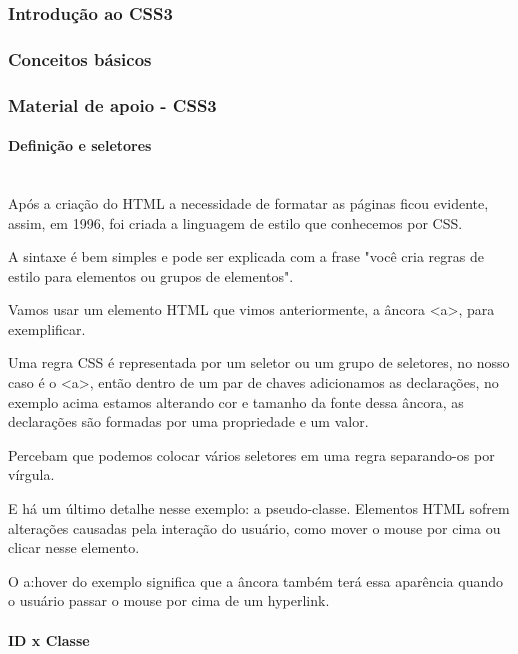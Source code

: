 \documentclass[12pt,a4paper]{article}
\begin{document}
	\subsubsection{Introdução ao CSS3}
	
	\subsubsection{Conceitos básicos}
	
	\subsubsection{Material de apoio - CSS3}
	
	\paragraph{Definição e seletores} \mbox{} \\
	
	Após a criação do HTML a necessidade de formatar as páginas ficou evidente, assim, em 1996, foi criada a linguagem de estilo que conhecemos por CSS.
	
	A sintaxe é bem simples e pode ser explicada com a frase "você cria regras de estilo para elementos ou grupos de elementos".
	
	Vamos usar um elemento HTML que vimos anteriormente, a âncora <a>, para exemplificar.
	
	Uma regra CSS é representada por um seletor ou um grupo de seletores, no nosso caso é o <a>, então dentro de um par de chaves adicionamos as declarações, no exemplo acima estamos alterando cor e tamanho da fonte dessa âncora, as declarações são formadas por uma propriedade e um valor.
	
	Percebam que podemos colocar vários seletores em uma regra separando-os por vírgula.
	
	E há um último detalhe nesse exemplo: a pseudo-classe. Elementos HTML sofrem alterações causadas pela interação do usuário, como mover o mouse por cima ou clicar nesse elemento.
	
	O a:hover do exemplo significa que a âncora também terá essa aparência quando o usuário passar o mouse por cima de um hyperlink.
	
	\paragraph{ID x Classe} \mbox{} \\
	
\end{document}
